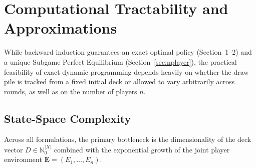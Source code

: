 \documentclass{article}
\theoremstyle{plain}
\theoremstyle{definition}
\theoremstyle{remark}
\begin{document}
\section{Computational Tractability and Approximations}
While backward induction guarantees an exact optimal policy (Section~1--2) and a unique Subgame Perfect Equilibrium (Section~\ref{sec:nplayer}), the practical feasibility of exact dynamic programming depends heavily on whether the draw pile is tracked from a fixed initial deck or allowed to vary arbitrarily across rounds, as well as on the number of players $n$.

\subsection{State-Space Complexity}
Across all formulations, the primary bottleneck is the dimensionality of the deck vector $D \in \mathbb{N}_0^{|X|}$ combined with the exponential growth of the joint player environment $\mathbf{E} = (E_1, \dots, E_n)$.
\end{document}
